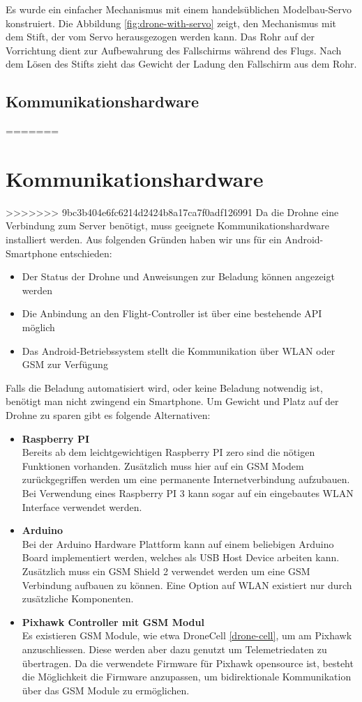 Es wurde ein einfacher Mechanismus mit einem handelsüblichen Modelbau-Servo konstruiert. Die Abbildung \ref{fig:drone-with-servo} zeigt, den Mechanismus mit dem Stift, der vom Servo herausgezogen werden kann. Das Rohr auf der Vorrichtung dient zur Aufbewahrung des Fallschirms während des Flugs. Nach dem Lösen des Stifts zieht das Gewicht der Ladung den Fallschirm aus dem Rohr.\\

\subsection{Kommunikationshardware}
\label{sec:communication-hardware}
=======
\section{Kommunikationshardware}
>>>>>>> 9bc3b404e6fc6214d2424b8a17ca7f0adf126991
Da die Drohne eine Verbindung zum Server benötigt, muss geeignete Kommunikationshardware installiert werden. Aus folgenden Gründen haben wir uns für ein Android-Smartphone entschieden:
\begin{itemize}
	\item{Der Status der Drohne und Anweisungen zur Beladung können angezeigt werden}
	\item{Die Anbindung an den Flight-Controller ist über eine bestehende API möglich}
	\item{Das Android-Betriebssystem stellt die Kommunikation über WLAN oder GSM zur Verfügung}
\end{itemize}

Falls die Beladung automatisiert wird, oder keine Beladung notwendig ist, benötigt man nicht zwingend ein Smartphone. Um Gewicht und Platz auf der Drohne zu sparen gibt es folgende Alternativen:
\begin{itemize}
	\item{\textbf{Raspberry PI} \\
	Bereits ab dem leichtgewichtigen Raspberry PI zero sind die nötigen Funktionen vorhanden. Zusätzlich muss hier auf ein GSM Modem zurückgegriffen werden um eine permanente Internetverbindung aufzubauen. Bei Verwendung eines Raspberry PI 3 kann sogar auf ein eingebautes WLAN Interface verwendet werden.
	}
	\item{\textbf{Arduino} \\
	Bei der Arduino Hardware Plattform kann auf einem beliebigen Arduino Board implementiert werden, welches als USB Host Device arbeiten kann. Zusätzlich muss ein GSM Shield 2 verwendet werden um eine GSM Verbindung aufbauen zu können. Eine Option auf WLAN existiert nur durch zusätzliche Komponenten.}
	\item{\textbf{Pixhawk Controller mit GSM Modul} \\
	Es existieren GSM Module, wie etwa DroneCell \ref{drone-cell}, um am Pixhawk anzuschliessen. Diese werden aber dazu genutzt um Telemetriedaten zu übertragen. Da die verwendete Firmware für Pixhawk opensource ist, besteht die Möglichkeit die Firmware anzupassen, um bidirektionale Kommunikation über das GSM Module zu ermöglichen.
	}

\end{itemize}


